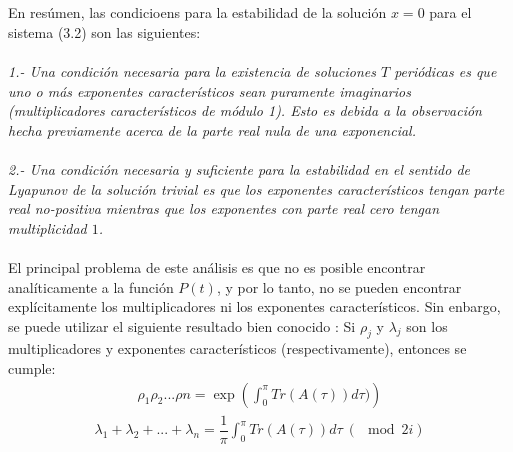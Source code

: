\\
\\
En resúmen, las condicioens para la estabilidad de la solución $x=0$ para el sistema (3.2) son las siguientes:
\\
\\
\textit{1.- Una condición necesaria para la existencia de soluciones $T$ periódicas es que uno o más exponentes característicos sean puramente imaginarios (multiplicadores característicos de módulo 1). Esto es debida a la observación hecha previamente acerca de la parte real nula de una exponencial.}
\\
\\
\textit{2.- Una condición necesaria y suficiente para la estabilidad en el sentido de Lyapunov de la solución trivial es que los exponentes característicos tengan parte real no-positiva mientras que los exponentes con parte real cero tengan multiplicidad $1$.}
\\
\\
El principal problema de este análisis es que no es posible encontrar analíticamente a la función $P(t)$, y por lo tanto, no se pueden encontrar explícitamente los multiplicadores ni los exponentes característicos. Sin enbargo, se puede utilizar el siguiente resultado bien conocido \citep{ver}: Si $\rho_{j}$ y $\lambda_{j}$ son los multiplicadores y exponentes característicos (respectivamente), entonces se cumple:
\begin{eqnarray}
\rho_{1}\rho_{2}...\rho{n}=\exp\left(\int_{0}^{\pi}Tr(A(\tau))d\tau) \right)
\end{eqnarray}
\begin{eqnarray}
\lambda_{1}+ \lambda_{2}+...+\lambda_{n}=\dfrac{1}{\pi}\int_{0}^{\pi}Tr(A(\tau))d\tau \ (\mod 2i)
\end{eqnarray}

